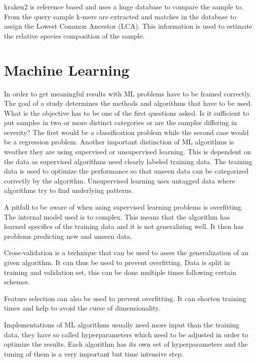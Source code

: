 kraken2 is reference based and uses a huge database to compare the sample to. From the query sample k-mers are extracted and matches in the database to assign the Lowest Common Ancestor (LCA). This information is used to estimate the relative species composition of the sample. \citep{kraken2}



\section{Machine Learning}
In order to get meaningful results with ML problems have to be framed correctly. The goal of a study determines the methods and algorithms that have to be used. 
What is the objective has to be one of the first questions asked. Is it sufficient to put samples in two or more distinct categories or are the samples differing in severity? The first would be a classification problem while the second case would be a regression problem.   
Another important distinction of ML algorithms is weather they are using supervised or unsupervised learning. This is dependent on the data as supervised algorithms need clearly labeled training data. The training data is used to optimize the performance so that unseen data can be categorized correctly by the algorithm. Unsupervised learning uses untagged data where algorithms try to find underlying patterns.

A pitfall to be aware of when using supervised learning problems is overfitting. The internal model used is to complex. This means that the algorithm has learned specifics of the training data and it is not generalizing well. It then has problems predicting new and unseen data. 

Cross-validation is a technique that can be used to asses the generalization of an given algorithm. It can thus be used to prevent overfitting. 
Data is split in training and validation set, this can be done multiple times following certain schemes.

Feature selection can also be used to prevent overfitting. It can shorten training times and help to avoid the curse of dimensionality.

Implementations of ML algorithms usually need more input than the training data, they have so called hyperparameters which need to be adjusted in order to optimize the results. Each algorithm has its own set of hyperparameters and the tuning of them is a very important but time intensive step.


